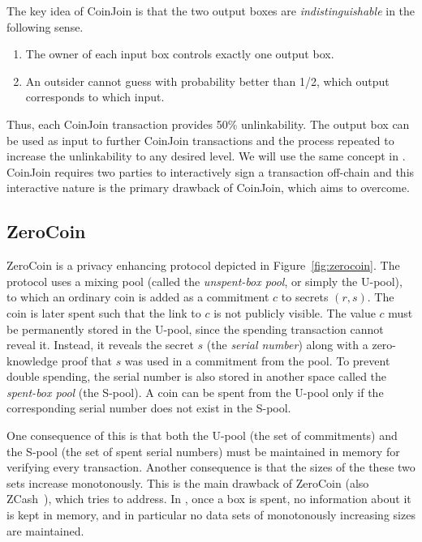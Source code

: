 \documentclass[runningheads]{llncs}
\begin{document}
The key idea of CoinJoin is that the two output boxes are {\em indistinguishable} in the following sense. 
\begin{enumerate}
    \item The owner of each input box controls exactly one output box.
    \item An outsider cannot guess with probability better than 1/2, which output corresponds to which input.
\end{enumerate}

Thus, each CoinJoin transaction provides 50\% unlinkability. The output box can be used as input to further CoinJoin transactions and the process repeated to increase the unlinkability to any desired level. We will use the same concept in \algname. 
CoinJoin requires two parties to interactively sign a transaction off-chain and this interactive nature is the primary drawback of CoinJoin, which \algname aims to overcome. 

\subsection{ZeroCoin}
\label{zerocoin} 

ZeroCoin is a privacy enhancing protocol depicted in Figure~\ref{fig:zerocoin}. 
The protocol uses a mixing pool (called the {\em unspent-box pool}, or simply the U-pool), to which an ordinary coin is added as a commitment $c$ to secrets $(r, s)$. The coin is later spent such that the link to $c$ is not publicly visible. The value $c$ must be permanently stored in the U-pool, since the spending transaction cannot reveal it. Instead, it reveals the secret $s$ (the {\em serial number}) along with a zero-knowledge proof that $s$ was used in a commitment from the pool. To prevent double spending, the serial number is also stored in another space called the {\em spent-box pool} (the S-pool). A coin can be spent from the U-pool only if the corresponding serial number does not exist in the S-pool. 

One consequence of this is that both the U-pool (the set of commitments) and the S-pool (the set of spent serial numbers) must be maintained in memory for verifying every transaction. 
Another consequence is that the sizes of the these two sets increase monotonously. 
This is the main drawback of ZeroCoin (also ZCash~\cite{zcash}), which \algname tries to address. 
In \algname, once a box is spent, no information about it is kept in memory, and in particular no data sets of monotonously increasing sizes are maintained. 
\end{document}
